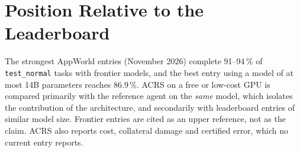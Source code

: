 \section{Position Relative to the Leaderboard}
\label{sec:aw-leaderboard}

The strongest AppWorld entries (November 2026) complete 91--94\,\% of \texttt{test\_normal} tasks with
frontier models, and the best entry using a model of at most 14B parameters reaches 86.9\,\%. ACRS on a
free or low-cost GPU is compared primarily with the reference agent on the \emph{same} model, which
isolates the contribution of the architecture, and secondarily with leaderboard entries of similar model
size. Frontier entries are cited as an upper reference, not as the claim. ACRS also reports cost,
collateral damage and certified error, which no current entry reports.
